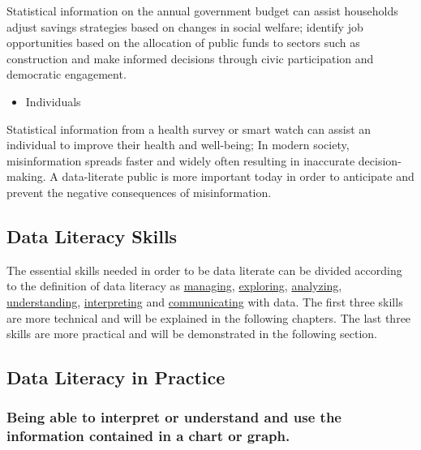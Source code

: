 \documentclass[
]{book}
\providecommand{\tightlist}{%
  \setlength{\itemsep}{0pt}\setlength{\parskip}{0pt}}
\begin{document}
Statistical information on the annual government budget can assist households adjust savings strategies based on changes in social welfare; identify job opportunities based on the allocation of public funds to sectors such as construction and make informed decisions through civic participation and democratic engagement. ~

\begin{itemize}
\tightlist
\item
  Individuals
\end{itemize}

Statistical information from a health survey or smart watch can assist an individual to improve their health and well-being; In modern society, misinformation spreads faster and widely often resulting in inaccurate decision-making. A data-literate public is more important today in order to anticipate and prevent the negative consequences of misinformation.

\subsection{Data Literacy Skills}\label{data-literacy-skills}

The essential skills needed in order to be data literate can be divided according to the definition of data literacy as \ul{managing}, \ul{exploring}, \ul{analyzing}, \ul{understanding}, \ul{interpreting} and \ul{communicating} with data. The first three skills are more technical and will be explained in the following chapters. The last three skills are more practical and will be demonstrated in the following section.

\subsection{Data Literacy in Practice}\label{data-literacy-in-practice}

\subsubsection{Being able to interpret or understand and use the information contained in a chart or graph.}\label{being-able-to-interpret-or-understand-and-use-the-information-contained-in-a-chart-or-graph.}
\end{document}
